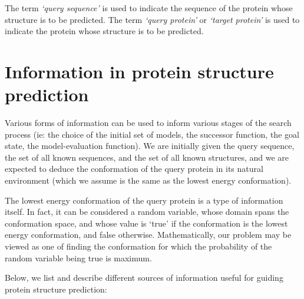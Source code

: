 \documentclass[10pt]{report}
\begin{document}
The term \textit{`query sequence'} is used to indicate the sequence of the protein whose structure is to be predicted. The term \textit{`query protein'} or \textit{`target protein'} is used to indicate the protein whose structure is to be predicted.

\chapter{Information in protein structure prediction}

Various forms of information can be used to inform various stages of the search process (ie: the choice of the initial set of models, the successor function, the goal state, the model-evaluation function). We are initially given the query sequence, the set of all known sequences, and the set of all known structures, and we are expected to deduce the conformation of the query protein in its natural environment (which we assume is the same as the lowest energy conformation).

The lowest energy conformation of the query protein is a type of information itself. In fact, it can be considered a random variable, whose domain spans the conformation space, and whose value is `true' if the conformation is the lowest energy conformation, and false otherwise. Mathematically, our problem may be viewed as one of finding the conformation for which the probability of the random variable being true is maximum.

Below, we list and describe different sources of information useful for guiding protein structure prediction:
\end{document}
